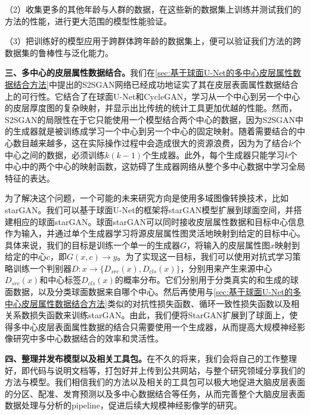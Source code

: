 （2）收集更多的其他年龄与人群的数据，在这些新的数据集上训练并测试我们的方法的性能，进行更大范围的模型性能验证。

（3）把训练好的模型应用于跨群体跨年龄的数据集上，便可以验证我们方法的跨数据集的鲁棒性与泛化能力。

\textbf{三、多中心的皮层属性数据结合。}我们在\ref{sec:基于球面U-Net的多中心皮层属性数据结合方法}中提出的S2SGAN网络已经成功地证实了其在皮层表面属性数据结合上的可行性。它结合了在球面U-Net和CycleGAN，学习从一个中心到另一个中心的皮层厚度图的复杂映射，并显示出比传统的统计工具更加优越的性能。然而，S2SGAN的局限性在于它只能使用一个模型结合两个中心的数据，因为S2SGAN中的生成器就是被训练成学习一个中心到另一个中心的固定映射。随着需要结合的中心数目越来越多，这在实际操作过程中会造成很大的资源浪费，因为为了结合$k$个中心之间的数据，必须训练$k(k-1)$个生成器。此外，每个生成器只能学习$k$个中心中的两个中心的映射函数，这妨碍了生成器网络从整个多中心数据中学习全局特征的表达。

为了解决这个问题，一个可能的未来研究方向是使用多域图像转换技术，比如starGAN\cite{choi2018stargan}。我们可以基于球面U-Net的框架将starGAN模型扩展到球面空间，并搭建相应的球面starGAN。球面starGAN可以同时接收皮层属性数据和目标中心信息作为输入，并通过单个生成器学习将源皮层属性图灵活地映射到给定的目标中心。具体来说，我们的目标是训练一个单一的生成器$G$，将输入的皮层属性图$x$映射到给定的中心$c$，即$G(x,c)\rightarrow y$。为了实现这一目标，我们可以使用对抗式学习策略\cite{goodfellow2014generative}训练一个判别器$D:x\rightarrow \{D_{src}(x),D_{cls}(x)\}$，分别用来产生来源中心$D_{src}(x)$和中心标签$D_{cls}(x)$的概率分布。它们分别用于分类真实的和生成的球面数据，以及分类球面数据来自哪个中心。然后再使用与\ref{sec:基于球面U-Net的多中心皮层属性数据结合方法}类似的对抗性损失函数、循环一致性损失函数以及相关系数损失函数来训练starGAN。由此，我们便将StarGAN扩展到了球面上，使得多中心皮层表面属性数据的结合只需要使用一个生成器，从而提高大规模神经影像研究中多中心数据结合的效率和灵活性。

\textbf{四、整理并发布模型以及相关工具包。}在不久的将来，我们会将自己的工作整理好，即代码与说明文档等，打包好并上传到公共网站，与整个研究领域分享我们的方法与模型。我们相信我们的方法以及相关的工具包可以极大地促进大脑皮层表面的分区、配准、发育预测以及多中心数据结合等任务，从而完善整个大脑皮层表面数据处理与分析的pipeline，促进后续大规模神经影像学的研究。